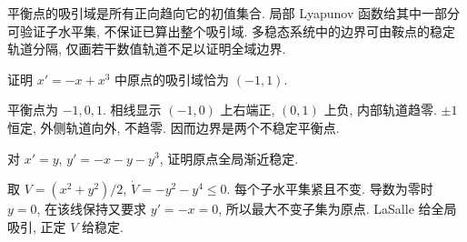 平衡点的吸引域是所有正向趋向它的初值集合. 局部 Lyapunov 函数给其中一部分可验证子水平集, 不保证已算出整个吸引域. 多稳态系统中的边界可由鞍点的稳定轨道分隔, 仅画若干数值轨道不足以证明全域边界.
\begin{exercise}证明 $x'=-x+x^3$ 中原点的吸引域恰为 $(-1,1)$.\end{exercise}
\begin{solution}平衡点为 $-1,0,1$. 相线显示 $(-1,0)$ 上右端正, $(0,1)$ 上负, 内部轨道趋零. $\pm1$ 恒定, 外侧轨道向外, 不趋零. 因而边界是两个不稳定平衡点.\end{solution}
\begin{exercise}对 $x'=y$, $y'=-x-y-y^3$, 证明原点全局渐近稳定.\end{exercise}
\begin{solution}取 $V=(x^2+y^2)/2$, $\dot V=-y^2-y^4\le0$. 每个子水平集紧且不变. 导数为零时 $y=0$, 在该线保持又要求 $y'=-x=0$, 所以最大不变子集为原点. LaSalle 给全局吸引, 正定 $V$ 给稳定.\end{solution}
